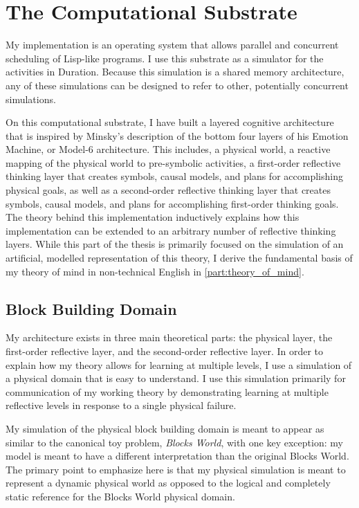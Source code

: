 \chapter{The Computational Substrate}
\label{chapter:the_computational_substrate}

My implementation is an operating system that allows parallel and
concurrent scheduling of Lisp-like programs.  I use this substrate as
a simulator for the activities in Duration.  Because this simulation
is a shared memory architecture, any of these simulations can be
designed to refer to other, potentially concurrent simulations.

On this computational substrate, I have built a layered cognitive
architecture that is inspired by Minsky's description of the bottom
four layers of his Emotion Machine, or Model-6 architecture.  This
includes, a physical world, a reactive mapping of the physical world
to pre-symbolic activities, a first-order reflective thinking layer
that creates symbols, causal models, and plans for accomplishing
physical goals, as well as a second-order reflective thinking layer
that creates symbols, causal models, and plans for accomplishing
first-order thinking goals.  The theory behind this implementation
inductively explains how this implementation can be extended to an
arbitrary number of reflective thinking layers.  While this part of
the thesis is primarily focused on the simulation of an artificial,
modelled representation of this theory, I derive the fundamental basis
of my theory of mind in non-technical English in
\autoref{part:theory_of_mind}.

\section{Block Building Domain}

My architecture exists in three main theoretical parts: the physical
layer, the first-order reflective layer, and the second-order
reflective layer.  In order to explain how my theory allows for
learning at multiple levels, I use a simulation of a physical domain
that is easy to understand.  I use this simulation primarily for
communication of my working theory by demonstrating learning at
multiple reflective levels in response to a single physical failure.

My simulation of the physical block building domain is meant to appear
as similar to the canonical toy problem, \emph{Blocks World}, with one
key exception: my model is meant to have a different interpretation
than the original Blocks World.  The primary point to emphasize here
is that my physical simulation is meant to represent a dynamic
physical world as opposed to the logical and completely static
reference for the Blocks World physical domain.




